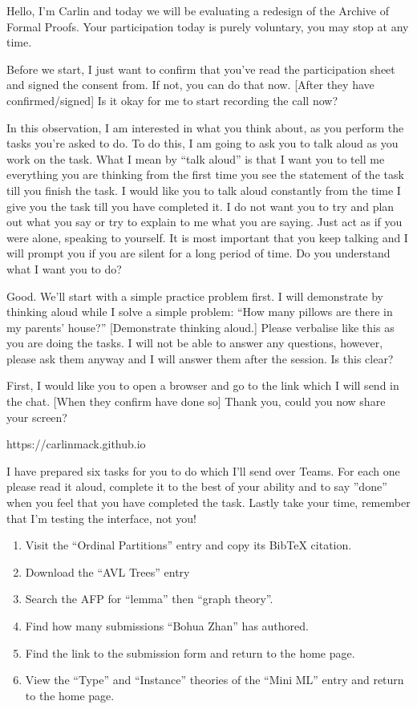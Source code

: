 \documentclass[bsc,frontabs,oneside,singlespacing,parskip,deptreport,logo]{infthesis}
\begin{document}
Hello, I’m Carlin and today we will be evaluating a redesign of the Archive of Formal Proofs. Your participation today is purely voluntary, you may stop at any time. 

Before we start, I just want to confirm that you’ve read the participation sheet and signed the consent from. If not, you can do that now. [After they have confirmed/signed] Is it okay for me to start recording the call now? 

In this observation, I am interested in what you think about, as you perform the tasks you’re asked to do. To do this, I am going to ask you to talk aloud as you work on the task. What I mean by “talk aloud” is that I want you to tell me everything you are thinking from the first time you see the statement of the task till you finish the task. I would like you to talk aloud constantly from the time I give you the task till you have completed it. I do not want you to try and plan out what you say or try to explain to me what you are saying. Just act as if you were alone, speaking to yourself. It is most important that you keep talking and I will prompt you if you are silent for a long period of time. Do you understand what I want you to do? 

Good. We’ll start with a simple practice problem first. I will demonstrate by thinking aloud while I solve a simple problem: “How many pillows are there in my parents' house?” [Demonstrate thinking aloud.] Please verbalise like this as you are doing the tasks. I will not be able to answer any questions, however, please ask them anyway and I will answer them after the session. Is this clear? 

First, I would like you to open a browser and go to the link which I will send in the chat. [When they confirm have done so] Thank you, could you now share your screen? 

https://carlinmack.github.io 

I have prepared six tasks for you to do which I’ll send over Teams. For each one please read it aloud, complete it to the best of your ability and to say ''done'' when you feel that you have completed the task. Lastly take your time, remember that I’m testing the interface, not you! 

\begin{enumerate}
    \item Visit the “Ordinal Partitions” entry and copy its BibTeX citation. 
    \item Download the “AVL Trees” entry 
    \item Search the AFP for “lemma” then “graph theory”. 
    \item Find how many submissions “Bohua Zhan” has authored. 
    \item Find the link to the submission form and return to the home page. 
    \item View the “Type” and “Instance” theories of the “Mini ML” entry and return to the home page. 
\end{enumerate}
\end{document}

